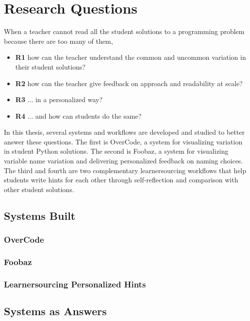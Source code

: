 \section{Research Questions}

When a teacher cannot read all the student solutions to a programming problem because there are too many of them,
\begin{itemize}
\item {\bf R1} how can the teacher understand the common and uncommon variation in their student solutions?
\item {\bf R2} how can the teacher give feedback on approach and readability at scale?
\item {\bf R3} ... in a personalized way?
\item {\bf R4} ... and how can students do the same?
\end{itemize}
In this thesis, several systems and workflows are developed and studied to better answer these questions. The first is OverCode, a system for visualizing variation in student Python solutions. The second is Foobaz, a system for visualizing variable name variation and delivering personalized feedback on naming choices. The third and fourth are two complementary learnersourcing workflows that help students write hints for each other through self-reflection and comparison with other student solutions.

\subsection{Systems Built}

\subsubsection{OverCode}

\subsubsection{Foobaz}

\subsubsection{Learnersourcing Personalized Hints}

\subsection{Systems as Answers}

